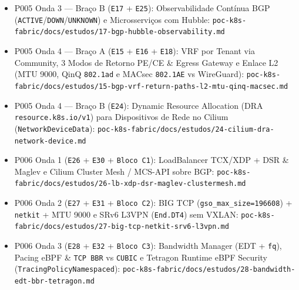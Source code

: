 \documentclass[12pt,openany,oneside,a4paper,chapter=TITLE,english,brazil]{abntex2}
\begin{document}
\begin{apendicesenv}
\begin{itemize}
\item
  P005 Onda 3 --- Braço B (\texttt{E17} + \texttt{E25}): Observabilidade Contínua BGP (\texttt{ACTIVE}/\texttt{DOWN}/\texttt{UNKNOWN}) e Microsserviços com Hubble: \texttt{poc-{}\allowbreak{}k8s-{}\allowbreak{}fabric/\allowbreak{}docs/\allowbreak{}estudos/\allowbreak{}17-{}\allowbreak{}bgp-{}\allowbreak{}hubble-{}\allowbreak{}observability.\allowbreak{}md}
\item
  P005 Onda 4 --- Braço A (\texttt{E15} + \texttt{E16} + \texttt{E18}): VRF por Tenant via Community, 3 Modos de Retorno PE/CE \& Egress Gateway e Enlace L2 (MTU 9000, QinQ \texttt{802.\allowbreak{}1ad} e MACsec \texttt{802.\allowbreak{}1AE} vs WireGuard): \texttt{poc-{}\allowbreak{}k8s-{}\allowbreak{}fabric/\allowbreak{}docs/\allowbreak{}estudos/\allowbreak{}15-{}\allowbreak{}bgp-{}\allowbreak{}vrf-{}\allowbreak{}return-{}\allowbreak{}paths-{}\allowbreak{}l2-{}\allowbreak{}mtu-{}\allowbreak{}qinq-{}\allowbreak{}macsec.\allowbreak{}md}
\item
  P005 Onda 4 --- Braço B (\texttt{E24}): Dynamic Resource Allocation (DRA \texttt{resource.\allowbreak{}k8s.\allowbreak{}io/\allowbreak{}v1}) para Dispositivos de Rede no Cilium (\texttt{Network\allowbreak{}Device\allowbreak{}Data}): \texttt{poc-{}\allowbreak{}k8s-{}\allowbreak{}fabric/\allowbreak{}docs/\allowbreak{}estudos/\allowbreak{}24-{}\allowbreak{}cilium-{}\allowbreak{}dra-{}\allowbreak{}network-{}\allowbreak{}device.\allowbreak{}md}
\item
  P006 Onda 1 (\texttt{E26} + \texttt{E30} + \texttt{Bloco C1}): LoadBalancer TCX/XDP + DSR \& Maglev e Cilium Cluster Mesh / MCS-API sobre BGP: \texttt{poc-{}\allowbreak{}k8s-{}\allowbreak{}fabric/\allowbreak{}docs/\allowbreak{}estudos/\allowbreak{}26-{}\allowbreak{}lb-{}\allowbreak{}xdp-{}\allowbreak{}dsr-{}\allowbreak{}maglev-{}\allowbreak{}clustermesh.\allowbreak{}md}
\item
  P006 Onda 2 (\texttt{E27} + \texttt{E31} + \texttt{Bloco C2}): BIG TCP (\texttt{gso\_\allowbreak{}max\_\allowbreak{}size=\allowbreak{}196608}) + \texttt{netkit} + MTU 9000 e SRv6 L3VPN (\texttt{End.\allowbreak{}DT4}) sem VXLAN: \texttt{poc-{}\allowbreak{}k8s-{}\allowbreak{}fabric/\allowbreak{}docs/\allowbreak{}estudos/\allowbreak{}27-{}\allowbreak{}big-{}\allowbreak{}tcp-{}\allowbreak{}netkit-{}\allowbreak{}srv6-{}\allowbreak{}l3vpn.\allowbreak{}md}
\item
  P006 Onda 3 (\texttt{E28} + \texttt{E32} + \texttt{Bloco C3}): Bandwidth Manager (EDT + \texttt{fq}), Pacing eBPF \& \texttt{TCP BBR} vs \texttt{CUBIC} e Tetragon Runtime eBPF Security (\texttt{Tracing\allowbreak{}Policy\allowbreak{}Namespaced}): \texttt{poc-{}\allowbreak{}k8s-{}\allowbreak{}fabric/\allowbreak{}docs/\allowbreak{}estudos/\allowbreak{}28-{}\allowbreak{}bandwidth-{}\allowbreak{}edt-{}\allowbreak{}bbr-{}\allowbreak{}tetragon.\allowbreak{}md}

\end{itemize}
\end{apendicesenv}
\end{document}
